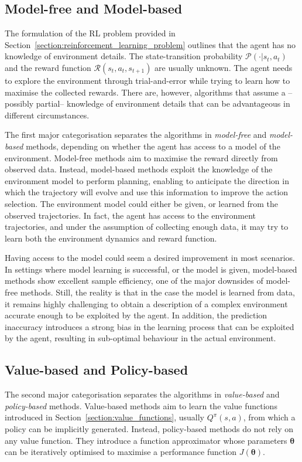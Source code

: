 \subsection{Model-free and Model-based}

The formulation of the \ac{RL} problem provided in Section~\ref{section:reinforcement_learning_problem} outlines that the agent has no knowledge of environment details.
The state-transition probability $\mathcal{P}(\cdot|s_t, a_t)$ and the reward function $\mathcal{R}(s_t, a_t, s_{t+1})$ are usually unknown.
The agent needs to explore the environment through trial-and-error while trying to learn how to maximise the collected rewards.
There are, however, algorithms that assume a --possibly partial-- knowledge of environment details that can be advantageous in different circumstances.

The first major categorisation separates the algorithms in \emph{model-free} and \emph{model-based} methods, depending on whether the agent has access to a model of the environment.
Model-free methods aim to maximise the reward directly from observed data.
Instead, model-based methods exploit the knowledge of the environment model to perform planning, enabling to anticipate the direction in which the trajectory will evolve and use this information to improve the action selection.
The environment model could either be given, or learned from the observed trajectories.
In fact, the agent has access to the environment trajectories, and under the assumption of collecting enough data, it may try to learn both the environment dynamics and reward function.

Having access to the model could seem a desired improvement in most scenarios.
In settings where model learning is successful, or the model is given, model-based methods show excellent sample efficiency, one of the major downsides of model-free methods.
Still, the reality is that in the case the model is learned from data, it remains highly challenging to obtain a description of a complex environment accurate enough to be exploited by the agent.
In addition, the prediction inaccuracy introduces a strong bias in the learning process that can be exploited by the agent, resulting in sub-optimal behaviour in the actual environment.

\subsection{Value-based and Policy-based}

The second major categorisation separates the algorithms in \emph{value-based} and \emph{policy-based} methods.
Value-based methods aim to learn the value functions introduced in Section~\ref{section:value_functions}, usually $Q^\pi(s, a)$, from which a policy can be implicitly generated.
Instead, policy-based methods do not rely on any value function.
They introduce a function approximator whose parameters $\boldsymbol{\theta}$ can be iteratively optimised to maximise a performance function $J(\boldsymbol{\theta})$.

